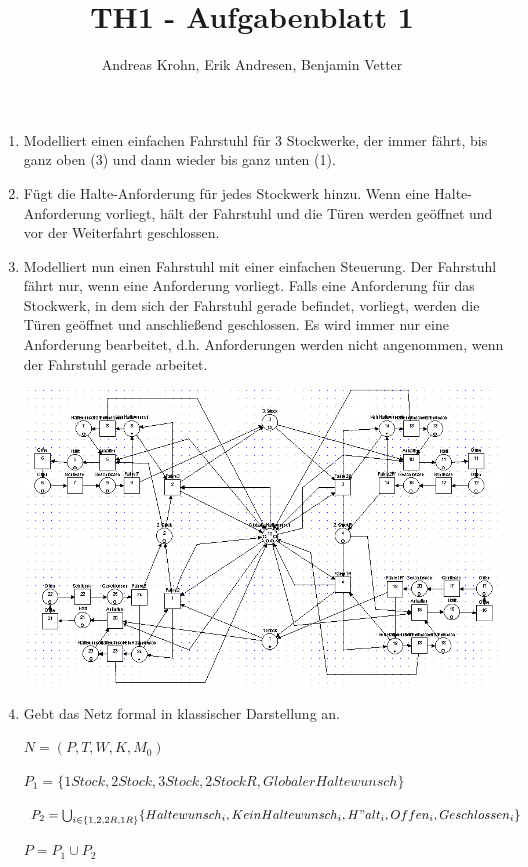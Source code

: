 \documentclass{report}
\title{TH1 - Aufgabenblatt 1}
\author{Andreas Krohn, Erik Andresen, Benjamin Vetter}
\begin{document}
\maketitle

\begin{enumerate}
\item Modelliert einen einfachen Fahrstuhl für 3 Stockwerke, der immer fährt, bis ganz oben (3) und dann wieder bis ganz unten (1).

\item Fügt die Halte-Anforderung für jedes Stockwerk hinzu. Wenn eine Halte-Anforderung vorliegt, hält der Fahrstuhl und die Türen werden geöffnet und vor der Weiterfahrt geschlossen.

\item Modelliert nun einen Fahrstuhl mit einer einfachen Steuerung. Der Fahrstuhl fährt nur, wenn eine Anforderung vorliegt. Falls eine Anforderung für das Stockwerk, in dem sich der Fahrstuhl gerade befindet, vorliegt, werden die Türen geöffnet und anschließend geschlossen. Es wird immer nur eine Anforderung bearbeitet, d.h. Anforderungen werden nicht angenommen, wenn der Fahrstuhl gerade arbeitet.

\includegraphics[width=1\textwidth]{graph.png}

\item Gebt das Netz formal in klassischer Darstellung an.

$N = (P, T, W, K, M_0)$

$P_1 = \{ 1Stock, 2Stock, 3Stock, 2StockR, GlobalerHaltewunsch \}$

$P_2 = \bigcup_{i \in \{ 1, 2, 2R, 1R \}} \{ Haltewunsch_i, KeinHaltewunsch_i, H"alt_i, Offen_i, Geschlossen_i \}$

$P = P_1 \cup P_2$


\end{enumerate}
\end{document}
